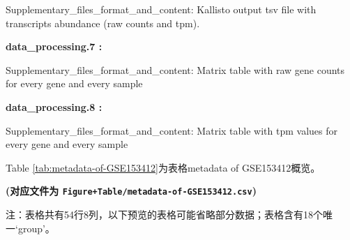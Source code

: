 \documentclass[
]{article}
\begin{document}
\begin{center}
\begin{tcolorbox}[colback=gray!10, colframe=gray!50, width=0.9\linewidth, arc=1mm, boxrule=0.5pt]
\vspace{0.5em}

    Supplementary\_files\_format\_and\_content: Kallisto output
tsv file with transcripts abundance (raw counts and tpm).

\vspace{2em}


\textbf{
data\_processing.7
:}

\vspace{0.5em}

    Supplementary\_files\_format\_and\_content: Matrix table
with raw gene counts for every gene and every sample

\vspace{2em}


\textbf{
data\_processing.8
:}

\vspace{0.5em}

    Supplementary\_files\_format\_and\_content: Matrix table
with tpm values for every gene and every sample

\vspace{2em}
\end{tcolorbox}
\end{center}

Table \ref{tab:metadata-of-GSE153412}为表格metadata of GSE153412概览。

\textbf{(对应文件为 \texttt{Figure+Table/metadata-of-GSE153412.csv})}

\begin{center}\begin{tcolorbox}[colback=gray!10, colframe=gray!50, width=0.9\linewidth, arc=1mm, boxrule=0.5pt]注：表格共有54行8列，以下预览的表格可能省略部分数据；表格含有18个唯一`group'。
\end{tcolorbox}
\end{center}
\end{document}
